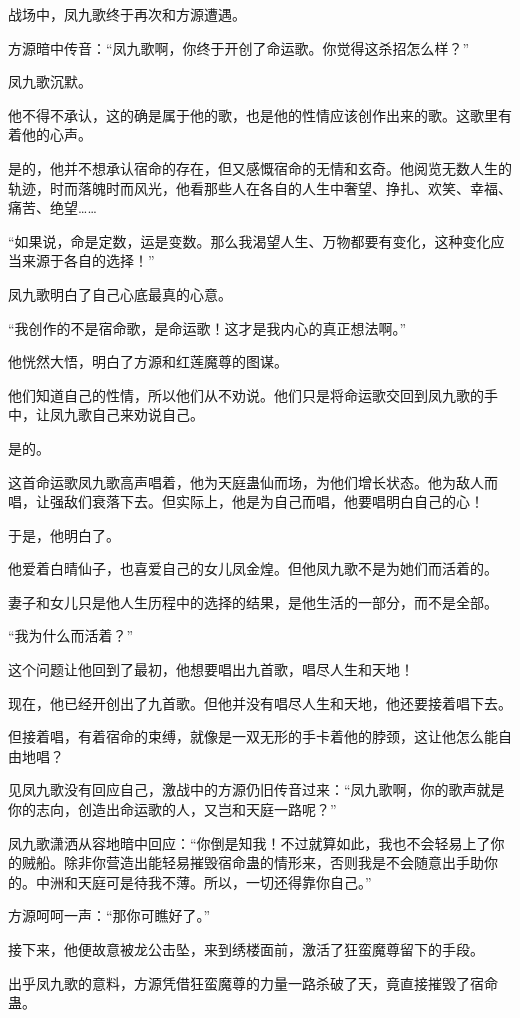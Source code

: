 \begin{this_body}
战场中，凤九歌终于再次和方源遭遇。

方源暗中传音：“凤九歌啊，你终于开创了命运歌。你觉得这杀招怎么样？”

凤九歌沉默。

他不得不承认，这的确是属于他的歌，也是他的性情应该创作出来的歌。这歌里有着他的心声。

是的，他并不想承认宿命的存在，但又感慨宿命的无情和玄奇。他阅览无数人生的轨迹，时而落魄时而风光，他看那些人在各自的人生中奢望、挣扎、欢笑、幸福、痛苦、绝望……

“如果说，命是定数，运是变数。那么我渴望人生、万物都要有变化，这种变化应当来源于各自的选择！”

凤九歌明白了自己心底最真的心意。

“我创作的不是宿命歌，是命运歌！这才是我内心的真正想法啊。”

他恍然大悟，明白了方源和红莲魔尊的图谋。

他们知道自己的性情，所以他们从不劝说。他们只是将命运歌交回到凤九歌的手中，让凤九歌自己来劝说自己。

是的。

这首命运歌凤九歌高声唱着，他为天庭蛊仙而场，为他们增长状态。他为敌人而唱，让强敌们衰落下去。但实际上，他是为自己而唱，他要唱明白自己的心！

于是，他明白了。

他爱着白晴仙子，也喜爱自己的女儿凤金煌。但他凤九歌不是为她们而活着的。

妻子和女儿只是他人生历程中的选择的结果，是他生活的一部分，而不是全部。

“我为什么而活着？”

这个问题让他回到了最初，他想要唱出九首歌，唱尽人生和天地！

现在，他已经开创出了九首歌。但他并没有唱尽人生和天地，他还要接着唱下去。

但接着唱，有着宿命的束缚，就像是一双无形的手卡着他的脖颈，这让他怎么能自由地唱？

见凤九歌没有回应自己，激战中的方源仍旧传音过来：“凤九歌啊，你的歌声就是你的志向，创造出命运歌的人，又岂和天庭一路呢？”

凤九歌潇洒从容地暗中回应：“你倒是知我！不过就算如此，我也不会轻易上了你的贼船。除非你营造出能轻易摧毁宿命蛊的情形来，否则我是不会随意出手助你的。中洲和天庭可是待我不薄。所以，一切还得靠你自己。”

方源呵呵一声：“那你可瞧好了。”

接下来，他便故意被龙公击坠，来到绣楼面前，激活了狂蛮魔尊留下的手段。

出乎凤九歌的意料，方源凭借狂蛮魔尊的力量一路杀破了天，竟直接摧毁了宿命蛊。


\end{this_body}
